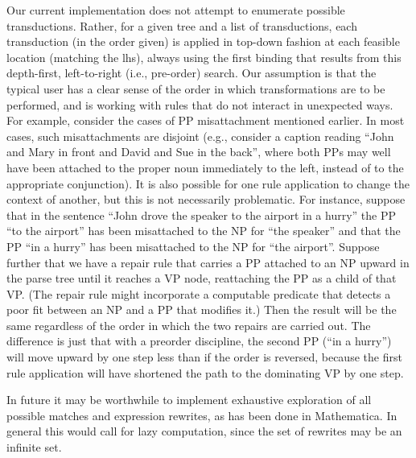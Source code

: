 \documentclass[a4,11pt]{article}
\begin{document}
Our current implementation does not attempt to enumerate possible transductions. Rather, for a given tree and a list of transductions, each transduction (in the order given) is applied in top-down fashion at each feasible location (matching the lhs), always using the first binding that results from this depth-first, left-to-right (i.e., pre-order) search. Our assumption is that the typical user has a clear sense of the order in which transformations are to be performed, and is working with rules that do not interact in unexpected ways. For example, consider the cases of PP misattachment mentioned earlier. In most cases, such misattachments are disjoint (e.g., consider a caption reading ``John and Mary in front and David and Sue in the back'', where both PPs may well have been attached to the proper noun immediately to the left, instead of to the appropriate conjunction). It is also possible for one rule application to change the context of another, but this is not necessarily problematic. For instance, suppose that in the sentence ``John drove the speaker to the airport in a hurry'' the PP ``to the airport'' has been misattached to the NP for ``the speaker'' and that the PP ``in a hurry'' has been misattached to the NP for ``the airport''. Suppose further that we have a repair rule that carries a PP attached to an NP upward in the parse tree until it reaches a VP node, reattaching the PP as a child of that VP. (The repair rule might incorporate a computable predicate that detects a poor fit between an NP and a PP that modifies it.) Then the result will be the same regardless of the order in which the two repairs are carried out. The difference is just that with a preorder discipline, the second PP (``in a hurry'') will move upward by one step less than if the order is reversed, because the first rule application will have shortened the path to the dominating VP by one step.

In future it may be worthwhile to implement exhaustive exploration of all possible matches and expression rewrites, as has been done in Mathematica. In general this would call for lazy computation, since the set of rewrites may be an infinite set.

\end{document}
